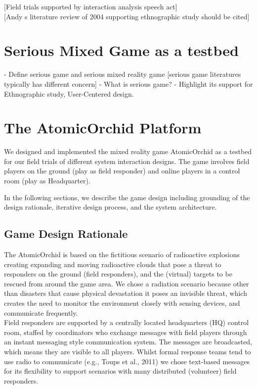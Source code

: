 [Field trials supported by interaction analysis  speech act]\\

[Andy s literature review of 2004 supporting ethnographic study should be cited]\\


\section{Serious Mixed Game as a testbed}

- Define serious game and serious mixed reality game [serious game literatures typically has different concern]
- What is serious game?
- Highlight its support for Ethnographic study, User-Centered design. 


\section{The AtomicOrchid Platform}
We designed and implemented the mixed reality game AtomicOrchid as a testbed for our field trials of different system interaction designs. The game involves field players on the ground (play as field responder) and online players in a control room (play as Headquarter). 


In the following sections, we describe the game design including grounding of the design rationale,  iterative design process, and the system architecture.

\subsection{Game Design Rationale}
The AtomicOrchid is based on the fictitious scenario of radioactive explosions creating expanding and moving radioactive clouds that pose a threat to responders on the ground (field responders), and the (virtual) targets to be rescued from around the game area. We chose a radiation scenario because other than disasters that cause physical devastation it poses an invisible threat, which creates the need to monitor the environment closely with sensing devices, and communicate frequently.\\

Field responders are supported by a centrally located headquarters (HQ) control room, staffed by coordinators who exchange messages with field players through an instant messaging style communication system. The messages are broadcasted, which means they are visible to all players. Whilst formal response teams tend to use radio to communicate (e.g., Toups et al., 2011) we chose text-based messages for its flexibility to support scenarios with many distributed (volunteer) field responders.\\

